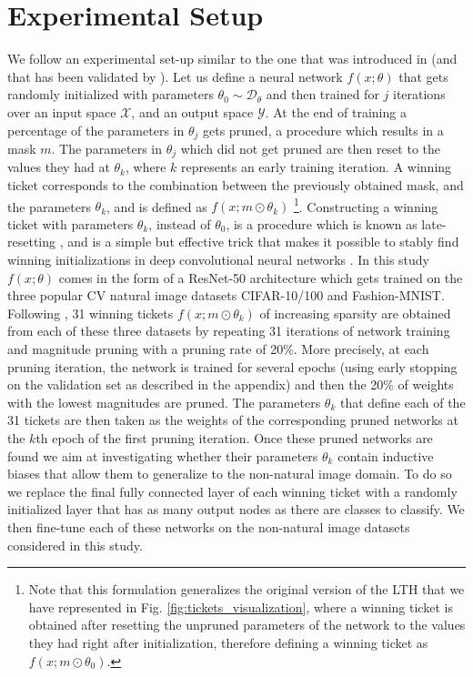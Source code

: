 \section{Experimental Setup}
\label{sec:experimental_setup}
We follow an experimental set-up similar to the one that was introduced in \cite{morcos2019one} (and that has been validated by \cite{gohil2019one}).
Let us define a neural network $f(x;\theta)$ that gets randomly initialized with parameters $\theta_0 \sim \mathcal{D_\theta}$ and then trained for $j$ iterations
over an input space $\mathcal{X}$, and an output space $\mathcal{Y}$. 
At the end of training a percentage of the parameters in $\theta_j$ gets pruned, a procedure which results in a mask $m$. The parameters in $\theta_j$ which did not get pruned are then reset to the values they had at $\theta_k$, where $k$ represents an early training iteration. A winning ticket corresponds to the combination between the previously obtained mask, and the parameters $\theta_k$, and is defined as $f(x;m\odot\theta_k)$ \footnote{Note that this formulation generalizes the original version of the LTH \cite{frankle2018lottery} that we have represented in Fig. \ref{fig:tickets_visualization}, where a winning ticket is obtained after resetting the unpruned parameters of the network to the values they had right after initialization, therefore defining a winning ticket as $f(x;m\odot\theta_0)$.}. Constructing a winning ticket with parameters $\theta_k$, instead of $\theta_0$, is a procedure which is known as late-resetting \cite{franklestabilizing}, and is a simple but effective trick that makes it possible to stably find winning initializations in deep convolutional neural networks \cite{franklestabilizing,morcos2019one}. In this study $f(x;\theta)$ comes in the form of a ResNet-50 architecture \cite{han2015deep} which gets trained on the three popular CV natural image datasets CIFAR-10/100 and Fashion-MNIST. Following \cite{han2015deep,morcos2019one}, 31 winning tickets $f(x;m\odot\theta_k)$ of increasing sparsity are obtained from each of these three datasets by repeating 31 iterations of network training and magnitude pruning with a pruning rate of 20\%.
More precisely, at each pruning iteration, the network is trained for several epochs (using early stopping on the validation set as described in the appendix) and then the 20\% of weights with the lowest magnitudes are pruned. The parameters $\theta_k$ that define each of the 31 tickets are then taken as the weights of the corresponding pruned networks at the $k$th epoch of the first pruning iteration. Once these pruned networks are found we aim at investigating whether their parameters $\theta_k$ contain inductive biases that allow them to generalize to the non-natural image domain. To do so we replace the final fully connected layer of each winning ticket with a randomly initialized layer that has as many output nodes as there are classes to classify. We then fine-tune each of these networks on the non-natural image datasets considered in this study.

